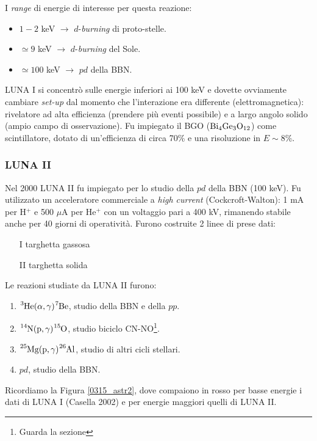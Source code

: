 I \textit{range} di energie di interesse per questa reazione:
\begin{itemize}
	\item $1-2$ keV $\to$ $d$-\textit{burning} di proto-stelle.
	\item $\simeq 9$ keV $\to$ $d$-\textit{burning} del Sole.
	\item $\simeq 100$ keV $\to$ $pd$ della BBN.
\end{itemize}
LUNA I si concentrò sulle energie inferiori ai 100 keV e dovette ovviamente cambiare \textit{set-up} dal momento che l'interazione era differente (elettromagnetica): rivelatore ad alta efficienza (prendere più eventi possibile) e a largo angolo solido (ampio campo di osservazione). Fu impiegato il BGO%
 ($\ce{Bi_4}\ce{Ge_3}\ce{O_{12}}$) come scintillatore, dotato di un'efficienza di circa 70\% e una risoluzione in $E\sim 8\%$.


\subsubsection{LUNA II}\label{sec-LUNAII}
Nel 2000 LUNA II fu impiegato per lo studio della $pd$ della BBN (100 keV). Fu utilizzato un acceleratore commerciale a \textit{high current} (Cockcroft-Walton): 1 mA per H$^+$ e 500 $\mu$A per He$^+$ con un voltaggio pari a 400 kV, rimanendo stabile anche per 40 giorni di operatività. Furono costruite 2 linee di prese dati:
\begin{enumerate}
	\item[I] targhetta gassosa
	\item[II] targhetta solida
\end{enumerate}
Le reazioni studiate da LUNA II furono:
\begin{enumerate}
	\item $\ce{^3He(\alpha,\gamma)\ce{^7Be}}$, studio della BBN e della $pp$.
	\item $\ce{^{14}N(p,\gamma)^{15}O}$, studio biciclo CN-NO\footnote{Guarda la sezione}.%
	\item $\ce{^{25}Mg(p,\gamma)^{26}Al}$, studio di altri cicli stellari.
	\item $pd$, studio della BBN. 
\end{enumerate}
Ricordiamo la Figura \ref{0315_astr2}, dove compaiono in rosso per basse energie i dati di LUNA I (Casella 2002) e per energie maggiori quelli di LUNA II.

